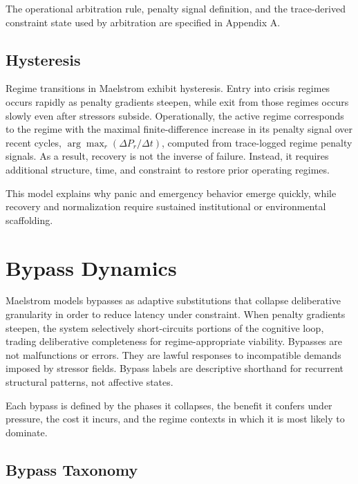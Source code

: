 \documentclass[11pt,a4paper]{article}
\begin{document}
The operational arbitration rule, penalty signal definition, and the trace-derived constraint state used by arbitration are specified in Appendix A.

\subsection{Hysteresis}

Regime transitions in Maelstrom exhibit hysteresis. Entry into crisis regimes occurs rapidly as penalty gradients steepen, while exit from those regimes occurs slowly even after stressors subside. Operationally, the active regime corresponds to the regime with the maximal finite-difference increase in its penalty signal over recent cycles, $\arg\max_r (\Delta P_r/\Delta t)$, computed from trace-logged regime penalty signals. As a result, recovery is not the inverse of failure. Instead, it requires additional structure, time, and constraint to restore prior operating regimes.

This model explains why panic and emergency behavior emerge quickly, while recovery and normalization require sustained institutional or environmental scaffolding.

\section{Bypass Dynamics}

Maelstrom models bypasses as adaptive substitutions that collapse deliberative granularity in order to reduce latency under constraint. When penalty gradients steepen, the system selectively short-circuits portions of the cognitive loop, trading deliberative completeness for regime-appropriate viability. Bypasses are not malfunctions or errors. They are lawful responses to incompatible demands imposed by stressor fields. Bypass labels are descriptive shorthand for recurrent structural patterns, not affective states.

Each bypass is defined by the phases it collapses, the benefit it confers under pressure, the cost it incurs, and the regime contexts in which it is most likely to dominate.

\subsection{Bypass Taxonomy}
\end{document}
